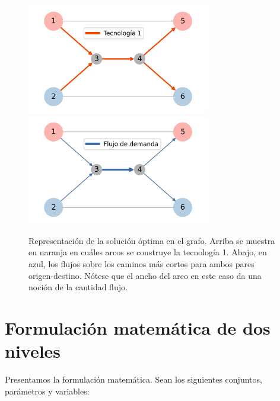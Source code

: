 \begin{figure}[h!]
  \centering
  \includegraphics[width=8cm]{../resources/example_1_infras.png}
  \includegraphics[width=8cm]{../resources/example_1_flows.png}
  \caption{Representación de la solución óptima en el grafo. Arriba se muestra en naranja en cuáles arcos se construye la tecnología 1. Abajo, en azul, los flujos sobre los caminos más cortos para ambos pares origen-destino. Nótese que el ancho del arco en este caso da una noción de la cantidad flujo.}
  \label{fig:example1solution}
\end{figure}

\FloatBarrier
\clearpage
\section{Formulación matemática de dos niveles}

Presentamos la formulación matemática. Sean los siguientes conjuntos, parámetros y variables:

